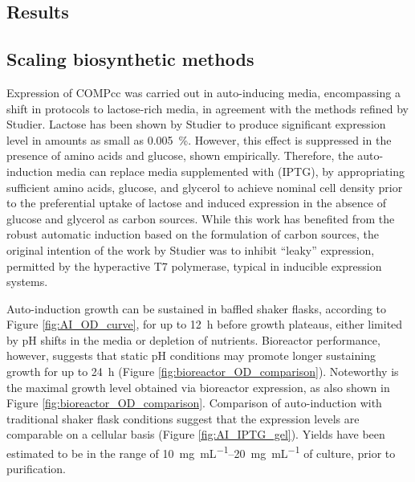 \begin{refsection}
\section{Results}

\subsection{Scaling biosynthetic methods}

\label{sec:comp_biosynthesis_results}
Expression of COMPcc was carried out in auto-inducing media, encompassing a
shift in protocols to lactose-rich media, in agreement with the methods refined
by Studier.\cite{Studier2005} Lactose has been shown by Studier to produce
significant expression level in amounts as small as \SI{0.005}{\percent}.
However, this effect is suppressed in the presence of amino acids and glucose,
shown empirically.\cite{Studier2005} Therefore, the auto-induction media can
replace media supplemented with 
(IPTG), by appropriating sufficient amino acids, glucose, and glycerol to
achieve nominal cell density prior to the preferential uptake of lactose and
induced expression in the absence of glucose and glycerol as carbon sources.
While this work has benefited from the robust automatic induction based on the
formulation of carbon sources, the original intention of the work by Studier was
to inhibit ``leaky'' expression, permitted by the hyperactive T7 polymerase,
typical in inducible expression systems.

Auto-induction growth can be sustained in baffled shaker flasks, according to
Figure \ref{fig:AI_OD_curve}, for up to \SI{12}{\hour} before growth plateaus,
either limited by pH shifts in the media or depletion of nutrients. Bioreactor
performance, however, suggests that static pH conditions may promote longer
sustaining growth for up to \SI{24}{\hour} (Figure
\ref{fig:bioreactor_OD_comparison}). Noteworthy is the maximal growth level
obtained via bioreactor expression, as also shown in Figure
\ref{fig:bioreactor_OD_comparison}. Comparison of auto-induction with
traditional shaker flask conditions suggest that the expression levels are
comparable on a cellular basis (Figure \ref{fig:AI_IPTG_gel}).  Yields have been
estimated to be in the range of \SIrange{10}{20}{\mg\per\mL} of culture, prior
to purification.


\end{refsection}
